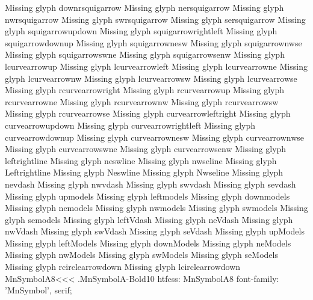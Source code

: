 Missing glyph	downrsquigarrow
Missing glyph	nersquigarrow
Missing glyph	nwrsquigarrow
Missing glyph	swrsquigarrow
Missing glyph	sersquigarrow
Missing glyph	squigarrowupdown
Missing glyph	squigarrowrightleft
Missing glyph	squigarrowdownup
Missing glyph	squigarrownesw
Missing glyph	squigarrownwse
Missing glyph	squigarrowswne
Missing glyph	squigarrowsenw
Missing glyph	lcurvearrowup
Missing glyph	lcurvearrowleft
Missing glyph	lcurvearrowne
Missing glyph	lcurvearrownw
Missing glyph	lcurvearrowsw
Missing glyph	lcurvearrowse
Missing glyph	rcurvearrowright
Missing glyph	rcurvearrowup
Missing glyph	rcurvearrowne
Missing glyph	rcurvearrownw
Missing glyph	rcurvearrowsw
Missing glyph	rcurvearrowse
Missing glyph	curvearrowleftright
Missing glyph	curvearrowupdown
Missing glyph	curvearrowrightleft
Missing glyph	curvearrowdownup
Missing glyph	curvearrownesw
Missing glyph	curvearrownwse
Missing glyph	curvearrowswne
Missing glyph	curvearrowsenw
Missing glyph	leftrightline
Missing glyph	neswline
Missing glyph	nwseline
Missing glyph	Leftrightline
Missing glyph	Neswline
Missing glyph	Nwseline
Missing glyph	nevdash
Missing glyph	nwvdash
Missing glyph	swvdash
Missing glyph	sevdash
Missing glyph	upmodels
Missing glyph	leftmodels
Missing glyph	downmodels
Missing glyph	nemodels
Missing glyph	nwmodels
Missing glyph	swmodels
Missing glyph	semodels
Missing glyph	leftVdash
Missing glyph	neVdash
Missing glyph	nwVdash
Missing glyph	swVdash
Missing glyph	seVdash
Missing glyph	upModels
Missing glyph	leftModels
Missing glyph	downModels
Missing glyph	neModels
Missing glyph	nwModels
Missing glyph	swModels
Missing glyph	seModels
Missing glyph	rcirclearrowdown
Missing glyph	lcirclearrowdown
\<MnSymbolA8\><<<
.MnSymbolA-Bold10
htfcss:  MnSymbolA8  font-family: 'MnSymbol', serif;

